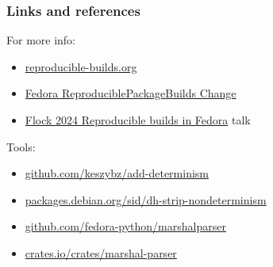 \documentclass[]{beamer}
\begin{document}
\begin{frame}
  \frametitle{Links and references}
  
  For more info:
  \begin{itemize}
  \item \href{https://reproducible-builds.org}{reproducible-builds.org}
  \item \href{https://fedoraproject.org/wiki/Changes/ReproduciblePackageBuilds}{Fedora ReproduciblePackageBuilds Change}
  \item \href{https://www.youtube.com/watch?v=nJHh-VJnGt8}{Flock 2024 Reproducible builds in Fedora} talk
  \end{itemize}

  Tools:
  \begin{itemize}
  \item \href{https://github.com/keszybz/add-determinism}{github.com/keszybz/add-determinism}
  \item \href{https://packages.debian.org/sid/dh-strip-nondeterminism}{packages.debian.org/sid/dh-strip-nondeterminism}
  \item \href{https://github.com/fedora-python/marshalparser}{github.com/fedora-python/marshalparser}
  \item \href{https://crates.io/crates/marshal-parser}{crates.io/crates/marshal-parser}
  \end{itemize}
\end{frame}
\end{document}
